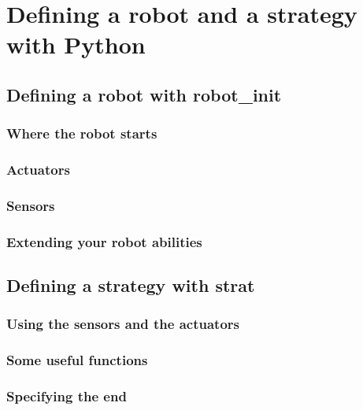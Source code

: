\documentclass[a4paper,11pt]{article}
\begin{document}
\section{Defining a robot and a strategy with Python}

\subsection{Defining a robot with robot\_init}

\subsubsection{Where the robot starts}

\subsubsection{Actuators}

\subsubsection{Sensors}

\subsubsection{Extending your robot abilities}


\subsection{Defining a strategy with strat}

\subsubsection{Using the sensors and the actuators}

\subsubsection{Some useful functions}

\subsubsection{Specifying the end}
\end{document}
